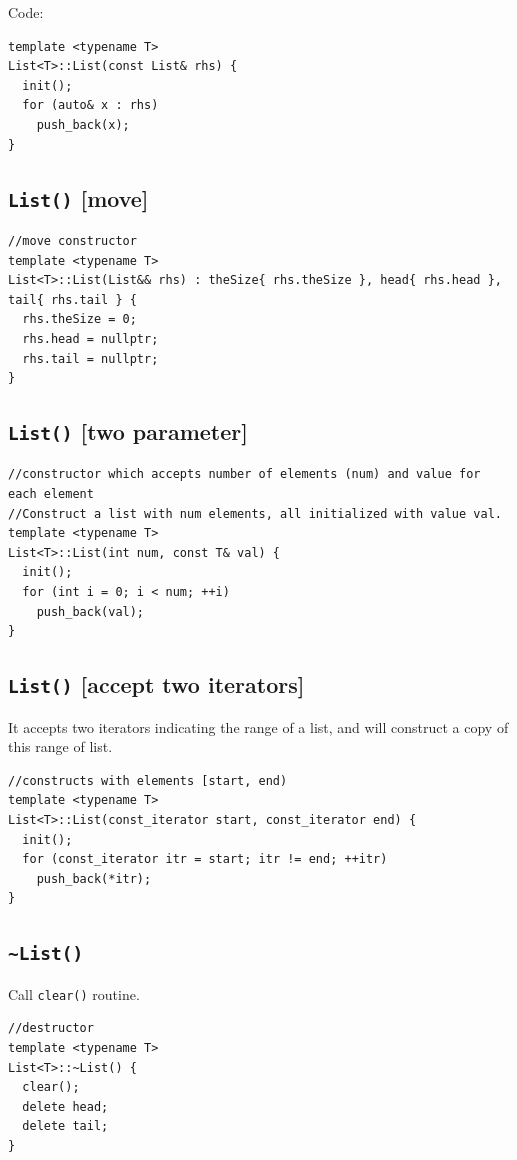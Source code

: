 \documentclass[11pt]{book}
\begin{document}
Code:
\begin{verbatim}
template <typename T>
List<T>::List(const List& rhs) {
  init();
  for (auto& x : rhs)
    push_back(x);
}
\end{verbatim}
\subsection{\texttt{List()} [move]}
\label{sec:orgbe5c8c6}
\begin{verbatim}
//move constructor
template <typename T>
List<T>::List(List&& rhs) : theSize{ rhs.theSize }, head{ rhs.head }, tail{ rhs.tail } {
  rhs.theSize = 0;
  rhs.head = nullptr;
  rhs.tail = nullptr;
}
\end{verbatim}
\subsection{\texttt{List()} [two parameter]}
\label{sec:orgdf869ab}
\begin{verbatim}
//constructor which accepts number of elements (num) and value for each element
//Construct a list with num elements, all initialized with value val.
template <typename T>
List<T>::List(int num, const T& val) {
  init();
  for (int i = 0; i < num; ++i)
    push_back(val);
}
\end{verbatim}
\subsection{\texttt{List()} [accept two iterators]}
\label{sec:orgcb21e3d}
It accepts two iterators indicating the range of a list, and will construct a copy of this range of list.
\begin{verbatim}
//constructs with elements [start, end)
template <typename T>
List<T>::List(const_iterator start, const_iterator end) {
  init();
  for (const_iterator itr = start; itr != end; ++itr)
    push_back(*itr);
}
\end{verbatim}
\subsection{\texttt{\textasciitilde{}List()}}
\label{sec:org3077467}
Call \texttt{clear()} routine.
\begin{verbatim}
//destructor
template <typename T>
List<T>::~List() {
  clear();
  delete head;
  delete tail;
}
\end{verbatim}
\end{document}
